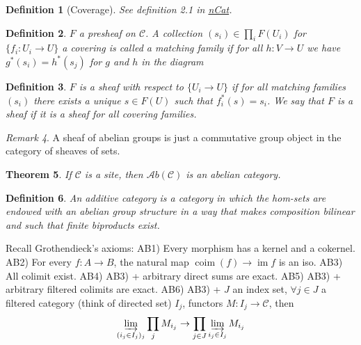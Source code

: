 \documentclass[12pt]{article}
\theoremstyle{darkgreentheorem}
\newtheorem{thm}{Theorem}
\theoremstyle{darkbluedefinition}
\newtheorem{defn}[thm]{Definition}
\theoremstyle{darkredexample}
\theoremstyle{remark}
\newtheorem{rem}[thm]{Remark}
\newcommand{\1}{\mathbbm{1}}
\newcommand{\scrC}{\mathscr{C}}
\newcommand{\Ab}{\mathscr{A}b}
\DeclareMathOperator{\im}{im}
\begin{document}
\begin{defn}[Coverage]
    See definition 2.1 in \href{https://ncatlab.org/nlab/show/coverage}{nCat}.
\end{defn}

\begin{defn}
    $F$ a presheaf on $\scrC$.
    A collection $(s_{i})\in \prod_{i}F(U_{i})$ for $\{f_{i}\colon U_{i}\to U\}$ a covering is called a \textit{matching family} if for all $h\colon V\to U$ we have $g^{*}(s_{i})=h^{*}(s_{j})$ for $g$ and $h$ in the diagram
    \begin{center}
    \end{center}
\end{defn}

\begin{defn}
    $F$ is a sheaf with respect to $\{U_{i}\to U\}$ if for all matching families $(s_{i})$ there exists a unique $s\in F(U)$ such that $f_{i}^{*}(s)=s_{i}$.
    We say that $F$ is a \textit{sheaf} if it is a sheaf for all covering families.
\end{defn}

\begin{rem}
    A sheaf of abelian groups is just a commutative group object in the category of sheaves of sets.
\end{rem}

\begin{thm}
    If $\scrC$ is a site, then $\Ab(\scrC)$ is an abelian category.
\end{thm}

\begin{defn}
    An additive category is a category in which the hom-sets are endowed with an abelian group structure in a way that makes composition bilinear and such that finite biproducts exist.
\end{defn}

Recall Grothendieck's axioms:
AB1) Every morphism has a kernel and a cokernel.
AB2) For every $f\colon A\to B$, the natural map $\operatorname{coim}(f)\to \im{f}$ is an iso.
AB3) All colimit exist.
AB4) AB3) + arbitrary direct sums are exact.
AB5) AB3) + arbitrary filtered colimits are exact.
AB6) AB3) + $J$ an index set, $\forall j\in J$ a filtered category (think of directed set) $I_{j}$, functors $M\colon I_{j}\to \scrC$, then
\[\varinjlim_{(i_{j}\in I_{j})_{j}}\prod_{j} M_{i_{j}}\to \prod_{j\in J}\varinjlim_{i_{j}\in I_{j}} M_{i_{j}} \]
\end{document}
